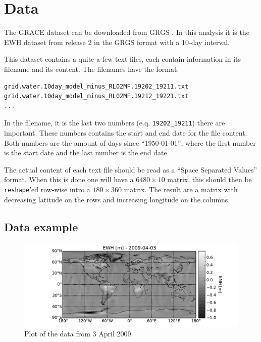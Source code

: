 \section{Data}

The GRACE dataset can be downloaded from GRGS \cite{GRACE-data-source}.
In this analysis it is the EWH dataset from release 2 in the GRGS format with a 10-day interval.

This dataset contains a quite a few text files, each contain information in its filename and its content.
The filenames have the format:

\begin{lstlisting}
grid.water.10day_model_minus_RL02MF.19202_19211.txt
grid.water.10day_model_minus_RL02MF.19212_19221.txt
...
\end{lstlisting}

In the filename, it is the last two numbers (e.q. \texttt{19202\_19211}) there are important.
These numbers contains the start and end date for the file content.
Both numbers are the amount of days since ``1950-01-01'', where the first number is the start date and the last number is the end date. \cite{GRACE-data-format-dates}

The actual content of each text file should be read as a ``Space Separated Values'' format.
When this is done one will have a $6480 \times 10$ matrix, this should then be \texttt{reshape}'ed row-wise intro a $180 \times 360$ matrix.
The result are a matrix with decreasing latitude on the rows and increasing longitude on the columns. \cite{GRACE-data-format-grids}

\subsection{Data example}

\begin{figure}[H]
	\centering
	\includegraphics[width=\textwidth]{figures/data-example-world}
	\caption{Plot of the data from 3 April 2009}
	\label{fig:data-example-world}
\end{figure}

